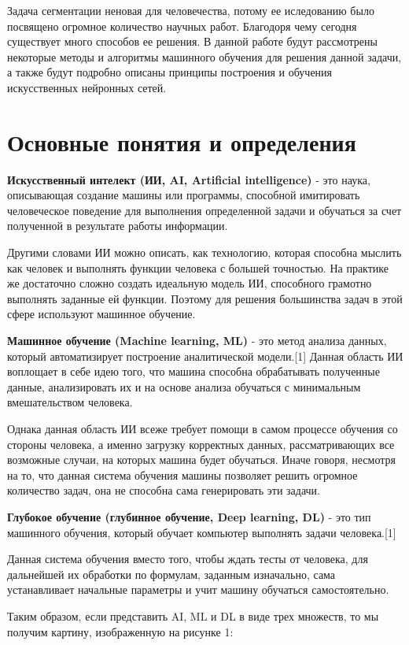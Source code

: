 \documentclass[bachelor, och, coursework]{shiza}
\begin{document}
Задача сегментации неновая для человечества, потому ее иследованию было посвящено огромное количество 
научных работ. Благодоря чему сегодня существует много способов ее решения. В данной работе будут рассмотрены 
некоторые методы и алгоритмы машинного обучения для решения данной задачи, а также будут подробно описаны
принципы построения и обучения искусственных нейронных сетей. 

\section{Основные понятия и определения}

\textbf{Искусственный интелект (ИИ, AI, Artificial intelligence)} - это наука, описывающая создание машины или программы,
способной имитировать человеческое поведение для выполнения определенной задачи и обучаться за счет полученной в результате
работы информации.

Другими словами ИИ можно описать, как технологию, которая способна мыслить как человек и выполнять функции человека с большей
точностью. На практике же достаточно сложно создать идеальную модель ИИ, способного грамотно выполнять заданные ей функции. 
Поэтому для решения большинства задач в этой сфере используют машинное обучение.

\textbf{Машинное обучение (Machine learning, ML)} - это метод анализа данных, который автоматизирует построение аналитической 
модели.[1] Данная область ИИ воплощает в себе идею того, что машина способна обрабатывать полученные данные, анализировать их 
и на основе анализа обучаться с минимальным вмешательством человека.

Однака данная область ИИ всеже требует помощи в самом процессе обучения со стороны человека, а именно загрузку корректных данных,
рассматривающих все возможные случаи, на которых машина будет обучаться. Иначе говоря, несмотря на то, что данная система обучения
машины позволяет решить огромное количество задач, она не способна сама генерировать эти задачи.

\textbf{Глубокое обучение (глубинное обучение, Deep learning, DL)} - это тип машинного обучения, который обучает компьютер выполнять 
задачи человека.[1]

Данная система обучения вместо того, чтобы ждать тесты от человека, для дальнейшей их обработки по формулам, заданным изначально,
сама устанавливает начальные параметры и учит машину обучаться самостоятельно.

Таким образом, если представить AI, ML и DL в виде трех множеств, то мы получим картину, изображенную на рисунке 1:
\end{document}
